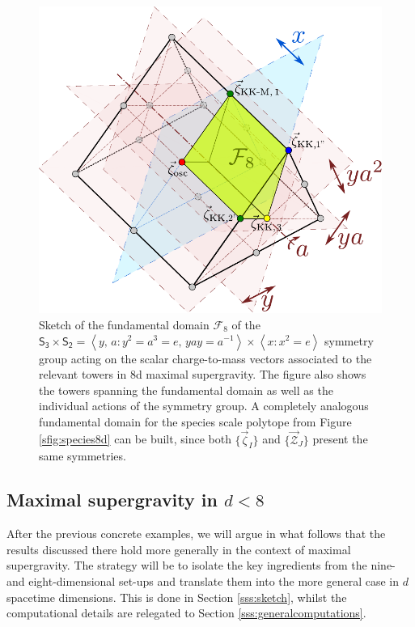 \begin{figure}[htb]
	\begin{center}
		\includegraphics[scale=.7]{MaxSugra8d-s.pdf}
		\caption{\small Sketch of the fundamental domain $\mathscr{F}_8$ of the $\mathsf{S_3}\times \mathsf{S_2}=\left \langle y,\,a: y^2=a^3=e,\, yay=a^{-1} \right\rangle\times\left\langle x: x^2=e\right\rangle$ symmetry group acting on the scalar charge-to-mass vectors associated to the relevant towers in 8d maximal supergravity. The figure also shows the towers spanning the fundamental domain as well as the individual actions of the symmetry group. A completely analogous fundamental domain for the species scale polytope from Figure \ref{sfig:species8d} can be built, since both $\{\vec{\zeta}_I\}$ and $\{\vec{\mathcal{Z}}_J\}$ present the same symmetries.} 
		\label{fig:sym}
	\end{center}
\end{figure}
	
\subsection{Maximal supergravity in $d<8$}
\label{ss:generaldim}
	
After the previous concrete examples, we will argue in what follows that the results discussed there hold more generally in the context of maximal supergravity. The strategy will be to isolate the key ingredients from the nine- and eight-dimensional set-ups and translate them into the more general case in $d$ spacetime dimensions. This is done in Section \ref{sss:sketch}, whilst the computational details are relegated to Section \ref{sss:generalcomputations}.
	
